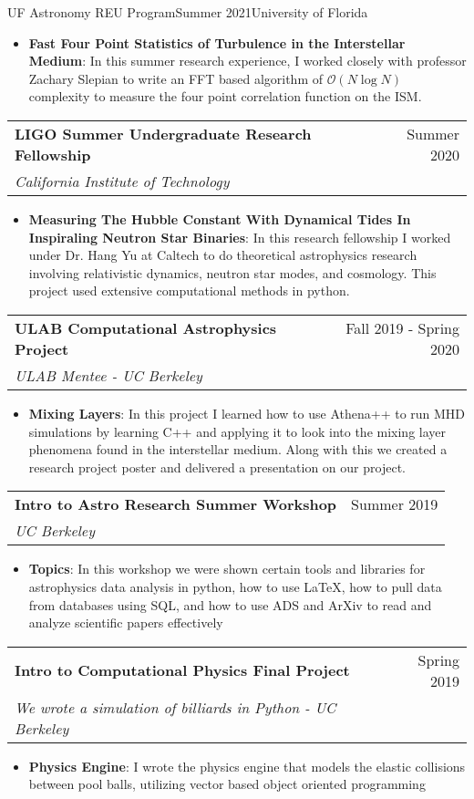\documentclass[letterpaper,10pt]{article}
\makeatletter
\newcommand{\resumeItem}[2]{
  \item\small{
    \textbf{#1}{: #2 \vspace{-3pt}}
  }
}
\newcommand{\resumeSubheading}[4]{
  \vspace{-1pt}\item[]
  \begin{tabular*}{0.98\textwidth}{l@{\extracolsep{\fill}}r}
      \hspace{-10pt}\textbf{#1} & #2 \\
      \hspace{-10pt}\textit{\small#3} & \textit{\small #4} \\
    \end{tabular*}\vspace{-3pt}
}
\newcommand{\resumeItemListStart}{\begin{itemize}}
\newcommand{\resumeItemListEnd}{\end{itemize}\vspace{-3pt}}
\makeatother
\begin{document}
        {UF Astronomy REU Program}{Summer 2021}{University of Florida}{}
        \resumeItemListStart
            \resumeItem{Fast Four Point Statistics of Turbulence in the Interstellar Medium}
                {In this summer research experience, I worked closely with professor Zachary Slepian to write an FFT based algorithm of $\mathcal{O}(N\log N)$ complexity to measure the four point correlation function on the ISM.}
        \resumeItemListEnd    
     \vspace{4pt}
     \resumeSubheading
        {LIGO Summer Undergraduate Research Fellowship}{Summer 2020}{California Institute of Technology}{}
        \resumeItemListStart
            \resumeItem{Measuring The Hubble Constant With Dynamical Tides In Inspiraling Neutron Star Binaries}
                {In this research fellowship I worked under Dr. Hang Yu at Caltech to do theoretical astrophysics research involving relativistic dynamics, neutron star modes, and cosmology. This project used extensive computational methods in python.}
        \resumeItemListEnd
    \vspace{4pt}
    \resumeSubheading
        {ULAB Computational Astrophysics Project}{Fall 2019 - Spring 2020}{ULAB Mentee - UC Berkeley}{}
        \resumeItemListStart
            \resumeItem{Mixing Layers}
                {In this project I learned how to use Athena++ to run MHD simulations by learning C++ and applying it to look into the mixing layer phenomena found in the interstellar medium. Along with this we created a research project poster and delivered a presentation on our project.}
        \resumeItemListEnd
     \vspace{4pt}
    \resumeSubheading
        {Intro to Astro Research Summer Workshop}{Summer 2019}
        {UC Berkeley}{}
        \resumeItemListStart
            \resumeItem{Topics}
                {In this workshop we were shown certain tools and libraries for astrophysics data analysis in python, how to use \LaTeX, how to pull data from databases using SQL, and how to use ADS and ArXiv to read and analyze scientific papers effectively}
        \resumeItemListEnd
    \vspace{4pt}
    \resumeSubheading
      {Intro to Computational Physics Final Project}{Spring 2019}
      {We wrote a simulation of billiards in Python - UC Berkeley}{}
      \resumeItemListStart
        \resumeItem{Physics Engine}
          {I wrote the physics engine that models the elastic collisions between pool balls, utilizing vector based object oriented programming}
      \resumeItemListEnd
\end{document}
